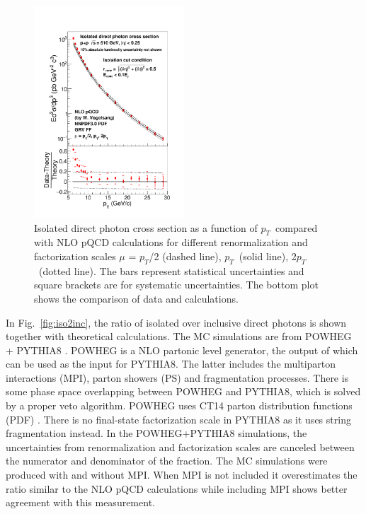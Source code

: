 \documentclass[twocolumn,letterpaper,aps,prl,longbibliography,superscriptaddress,floatfix]{revtex4-2}
\newcommand{\pT}{\ensuremath{p_T}}
\begin{document}
\begin{figure} 
\centering
\includegraphics[width=0.5\textwidth]{CrossSection-isophoton-werner}
\caption{Isolated direct photon cross section as a function of \pT\ compared with NLO pQCD calculations \cite{PhysRevD.48.3136,PhysRevD.50.1901} for different renormalization and factorization scales $\mu$ = \pT/2 (dashed line), \pT\ (solid line), 2\pT\ (dotted line). The bars represent statistical uncertainties and square brackets are for systematic uncertainties. The bottom plot shows the comparison of data and calculations.}
\label{fig:iso}
\end{figure}

In Fig.~\ref{fig:iso2inc}, the ratio of isolated over inclusive direct photons is shown together with theoretical calculations. The MC simulations are from POWHEG + PYTHIA8 \cite{Nason_2004, Frixione_2007, Alioli2010, Jezo2016, Klasen2018}. POWHEG is a NLO partonic level generator, the output of which can be used as the input for PYTHIA8. The latter includes the multiparton interactions (MPI), parton showers (PS) and fragmentation processes. There is some phase space overlapping between POWHEG and PYTHIA8, which is solved by a proper veto algorithm. POWHEG uses CT14 parton distribution functions (PDF) \cite{PhysRevD.93.033006}. There is no final-state factorization scale in PYTHIA8 as it uses string fragmentation instead. In the POWHEG+PYTHIA8 simulations, the uncertainties from renormalization and factorization scales are canceled between the numerator and denominator of the fraction. The MC simulations were produced with and without MPI. When MPI is not included it overestimates the ratio similar to the NLO pQCD calculations while including MPI shows better agreement with this measurement.
\end{document}
